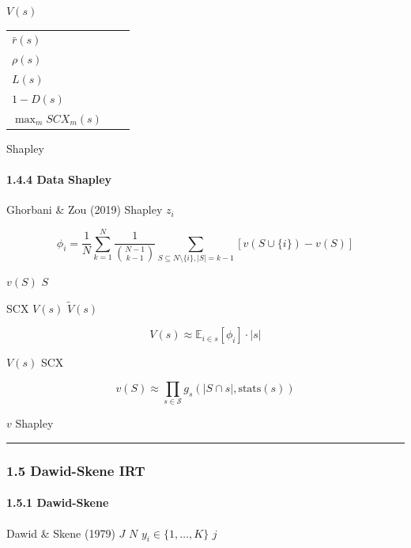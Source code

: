 \documentclass[
  12pt,
]{article}
\begin{document}
 \(V(s)\) 

\begin{longtable}[]{@{}lll@{}}
\toprule\noalign{}
 &  &  \\
\midrule\noalign{}
\endhead
\bottomrule\noalign{}
\endlastfoot
\(\bar{r}(s)\) &  &  \\
\(\rho(s)\) &  &  \\
\(L(s)\) &  &  \\
\(1-D(s)\) &  &  \\
\(\max_m SCX_m(s)\) &  &  \\
\end{longtable}

\textbf{} Shapley 

\paragraph{1.4.4  Data Shapley
}\label{ux4e0e-data-shapley-ux7684ux7cbeux786eux5173ux7cfb}

Ghorbani \& Zou (2019)  Shapley  \(z_i\)


\[\phi_i = \frac{1}{N} \sum_{k=1}^N \frac{1}{\binom{N-1}{k-1}} \sum_{S \subseteq N \setminus \{i\}, |S| = k-1} [v(S \cup \{i\}) - v(S)]\]

 \(v(S)\)  \(S\) 

SCX  \(V(s)\) \textbf{} \(\tilde{V}(s)\)

\[V(s) \approx \mathbb{E}_{i \in s}[\phi_i] \cdot |s|\]

 \(V(s)\)  SCX \textbf{}

\[v(S) \approx \prod_{s \in \mathcal{S}} g_s(|S \cap s|, \text{stats}(s))\]

 \(v\) Shapley 

\begin{center}\rule{0.5\linewidth}{0.5pt}\end{center}

\subsubsection{1.5 Dawid-Skene 
IRT}\label{ux4e13ux5bb6ux53efux9760ux6027dawid-skene-ux4e0e-irt}

\paragraph{1.5.1 Dawid-Skene
}\label{dawid-skene-ux6807ux6ce8ux8005ux6a21ux578b}

Dawid \& Skene (1979)  \(J\)
 \(N\) 
\(y_i \in \{1,\ldots,K\}\) \(j\) 
\end{document}
